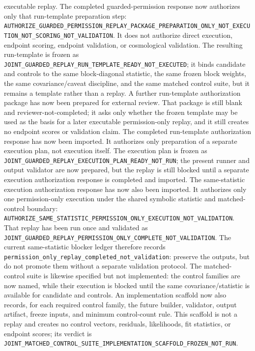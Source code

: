 executable replay.  The completed guarded-permission response now authorizes
only that run-template preparation step:
\texttt{AUTHORIZE\_GUARDED\_PERMISSION\_REPLAY\_PACKAGE\_PREPARATION\_ONLY\_NOT\_EXECUTION\_NOT\_SCORING\_NOT\_VALIDATION}.
It does not authorize direct execution, endpoint scoring, endpoint validation,
or cosmological validation.  The resulting run-template is frozen as
\texttt{JOINT\_GUARDED\_REPLAY\_RUN\_TEMPLATE\_READY\_NOT\_EXECUTED}; it binds
candidate and controls to the same block-diagonal statistic, the same frozen
block weights, the same covariance/caveat discipline, and the same matched
control suite, but it remains a template rather than a replay.
A further run-template authorization package has now been prepared for external
review.  That package is still blank and reviewer-not-completed; it asks only
whether the frozen template may be used as the basis for a later executable
permission-only replay, and it still creates no endpoint scores or validation
claim.
The completed run-template authorization response has now been imported.  It
authorizes only preparation of a separate execution plan, not execution itself.
The execution plan is frozen as
\texttt{JOINT\_GUARDED\_REPLAY\_EXECUTION\_PLAN\_READY\_NOT\_RUN}; the present
runner and output validator are now prepared, but the replay is still blocked
until a separate execution authorization response is completed and imported.
The same-statistic execution authorization response has now also been imported.
It authorizes only one permission-only execution under the shared symbolic
statistic and matched-control boundary:
\texttt{AUTHORIZE\_SAME\_STATISTIC\_PERMISSION\_ONLY\_EXECUTION\_NOT\_VALIDATION}.
That replay has been run once and validated as
\texttt{JOINT\_GUARDED\_REPLAY\_PERMISSION\_ONLY\_COMPLETE\_NOT\_VALIDATION}.
The current same-statistic blocker ledger therefore records
\texttt{permission\_only\_replay\_completed\_not\_validation}: preserve the
outputs, but do not promote them without a separate validation protocol.
The matched-control suite is likewise specified but not implemented: the
control families are now named, while their execution is blocked until the same
covariance/statistic is available for candidate and controls.
An implementation scaffold now also records, for each required control family,
the future builder, validator, output artifact, freeze inputs, and minimum
control-count rule.  This scaffold is not a replay and creates no control
vectors, residuals, likelihoods, fit statistics, or endpoint scores; its verdict
is
\texttt{JOINT\_MATCHED\_CONTROL\_SUITE\_IMPLEMENTATION\_SCAFFOLD\_FROZEN\_NOT\_RUN}.
